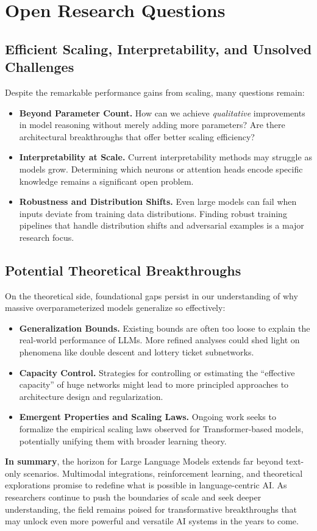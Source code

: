 \section{Open Research Questions}
\label{sec:open_questions}

\subsection{Efficient Scaling, Interpretability, and Unsolved Challenges}
\noindent
Despite the remarkable performance gains from scaling, many questions remain:
\begin{itemize}
    \item \textbf{Beyond Parameter Count.} How can we achieve \emph{qualitative} improvements in model reasoning without merely adding more parameters? Are there architectural breakthroughs that offer better scaling efficiency?
    \item \textbf{Interpretability at Scale.} Current interpretability methods may struggle as models grow. Determining which neurons or attention heads encode specific knowledge remains a significant open problem.
    \item \textbf{Robustness and Distribution Shifts.} Even large models can fail when inputs deviate from training data distributions. Finding robust training pipelines that handle distribution shifts and adversarial examples is a major research focus.
\end{itemize}

\subsection{Potential Theoretical Breakthroughs}
\noindent
On the theoretical side, foundational gaps persist in our understanding of why massive overparameterized models generalize so effectively:
\begin{itemize}
    \item \textbf{Generalization Bounds.} Existing bounds are often too loose to explain the real-world performance of LLMs. More refined analyses could shed light on phenomena like double descent and lottery ticket subnetworks.
    \item \textbf{Capacity Control.} Strategies for controlling or estimating the “effective capacity” of huge networks might lead to more principled approaches to architecture design and regularization.
    \item \textbf{Emergent Properties and Scaling Laws.} Ongoing work seeks to formalize the empirical scaling laws observed for Transformer-based models, potentially unifying them with broader learning theory.
\end{itemize}

\noindent
\textbf{In summary}, the horizon for Large Language Models extends far beyond text-only scenarios. Multimodal integrations, reinforcement learning, and theoretical explorations promise to redefine what is possible in language-centric AI. As researchers continue to push the boundaries of scale and seek deeper understanding, the field remains poised for transformative breakthroughs that may unlock even more powerful and versatile AI systems in the years to come.
